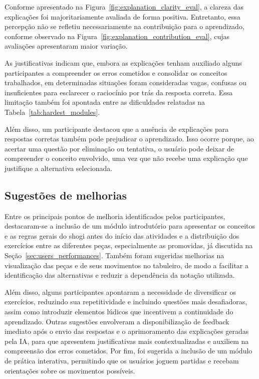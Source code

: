 Conforme apresentado na Figura~\ref{fig:explanation_clarity_eval}, a clareza das explicações foi majoritariamente avaliada de forma positiva. 
Entretanto, essa percepção não se refletiu necessariamente na contribuição para o aprendizado, conforme observado na Figura~\ref{fig:explanation_contribution_eval}, 
cujas avaliações apresentaram maior variação.

As justificativas indicam que, embora as explicações tenham auxiliado alguns participantes a compreender os erros cometidos e consolidar os conceitos trabalhados, 
em determinadas situações foram consideradas vagas, confusas ou insuficientes para esclarecer o raciocínio por trás da resposta correta. Essa limitação também foi 
apontada entre as dificuldades relatadas na Tabela~\ref{tab:hardest_modules}.

Além disso, um participante destacou que a ausência de explicações para respostas corretas também pode prejudicar o aprendizado. Isso ocorre porque, ao acertar 
uma questão por eliminação ou tentativa, o usuário pode deixar de compreender o conceito envolvido, uma vez que não recebe uma explicação que justifique a alternativa selecionada.



\subsection{Sugestões de melhorias}
\label{sec:improvements}
Entre os principais pontos de melhoria identificados pelos participantes, destacaram-se a inclusão de um módulo introdutório para apresentar os conceitos e as regras gerais 
do shogi antes do início das atividades e a distribuição dos exercícios entre as diferentes peças, especialmente as promovidas, já discutida na Seção~\ref{sec:users_performances}. 
Também foram sugeridas melhorias na visualização das peças e de seus movimentos no tabuleiro, de modo a facilitar a identificação das alternativas e reduzir a dependência da 
notação utilizada.

Além disso, alguns participantes apontaram a necessidade de diversificar os exercícios, reduzindo sua repetitividade e incluindo questões mais desafiadoras, assim como introduzir 
elementos lúdicos que incentivem a continuidade do aprendizado. Outras sugestões envolveram a disponibilização de feedback imediato após o envio das respostas e o aprimoramento das 
explicações geradas pela IA, para que apresentem justificativas mais contextualizadas e auxiliem na compreensão dos erros cometidos. Por fim, foi sugerida a inclusão de um módulo de 
prática interativa, permitindo que os usuários joguem partidas e recebam orientações sobre os movimentos possíveis.